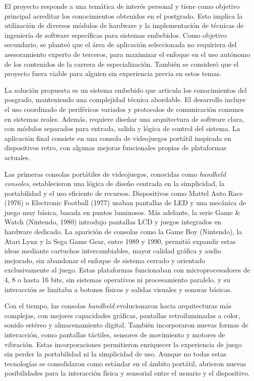 \documentclass[
11pt, %
]{charter}
\begin{document}
El proyecto responde a una temática de interés personal y tiene como objetivo principal acreditar los conocimientos obtenidos en el postgrado. Esto implica la utilización de diversos módulos de hardware y la implementación de técnicas de ingeniería de software específicas para sistemas embebidos. Como objetivo secundario, se planteó que el área de aplicación seleccionada no requiriera del asesoramiento experto de terceros, para maximizar el enfoque en el uso autónomo de los contenidos de la carrera de especialización. También se consideró que el proyecto fuera viable para alguien sin experiencia previa en estos temas.

La solución propuesta es un sistema embebido que articula los conocimientos del posgrado, manteniendo una complejidad técnica abordable. El desarrollo incluye el uso coordinado de periféricos variados y protocolos de comunicación comunes en sistemas reales. Además, requiere diseñar una arquitectura de software clara, con módulos separados para entrada, salida y lógica de control del sistema. La aplicación final consiste en una consola de videojuegos portátil inspirada en dispositivos retro, con algunas mejoras funcionales propias de plataformas actuales.

Las primeras consolas portátiles de videojuegos, conocidas como \textit{handheld consoles}, establecieron una lógica de diseño centrada en la simplicidad, la portabilidad y el uso eficiente de recursos. Dispositivos como Mattel Auto Race (1976) o Electronic Football (1977) usaban pantallas de LED y una mecánica de juego muy básica, basada en puntos luminosos. Más adelante, la serie Game \& Watch (Nintendo, 1980) introdujo pantallas LCD y juegos integrados en hardware dedicado. La aparición de consolas como la Game Boy (Nintendo), la Atari Lynx y la Sega Game Gear, entre 1989 y 1990, permitió expandir estas ideas mediante cartuchos intercambiables, mayor calidad gráfica y audio mejorado, sin abandonar el enfoque de sistema cerrado y orientado exclusivamente al juego. Estas plataformas funcionaban con microprocesadores de 4, 8 o hasta 16 bits, sin sistemas operativos ni procesamiento paralelo, y su interacción se limitaba a botones físicos y salidas visuales y sonoras básicas.

Con el tiempo, las consolas \textit{handheld} evolucionaron hacia arquitecturas más complejas, con mejores capacidades gráficas, pantallas retroiluminadas a color, sonido estéreo y almacenamiento digital. También incorporaron nuevas formas de interacción, como pantallas táctiles, sensores de movimiento y motores de vibración. Estas incorporaciones permitieron enriquecer la experiencia de juego sin perder la portabilidad ni la simplicidad de uso. Aunque no todas estas tecnologías se consolidaron como estándar en el ámbito portátil, abrieron nuevas posibilidades para la interacción física y sensorial entre el usuario y el dispositivo.
\end{document}
